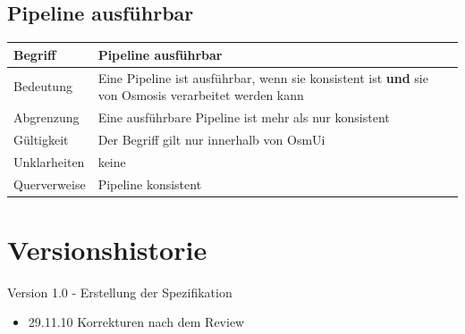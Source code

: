 \documentclass[a4paper,12pt]{scrartcl}
\begin{document}
\begin{center}
\subsection{Pipeline ausführbar}
\begin{tabular}{|p{5cm}|p{10cm}|}
\hline Begriff & \textbf{Pipeline ausführbar} \\ 
\hline Bedeutung & Eine Pipeline ist ausführbar, wenn sie konsistent ist \textbf{und} sie von Osmosis verarbeitet werden kann\\ 
\hline Abgrenzung & Eine ausführbare Pipeline ist mehr als nur konsistent \\ 
\hline Gültigkeit & Der Begriff gilt nur innerhalb von OsmUi \\  
\hline Unklarheiten & keine \\ 
\hline Querverweise & Pipeline konsistent \\ 
\hline 
\end{tabular}
\end{center}
\section{Versionshistorie} Version 1.0 - Erstellung der Spezifikation
\begin{itemize}
\item 29.11.10	Korrekturen nach dem Review
\end{itemize}
\end{document}
